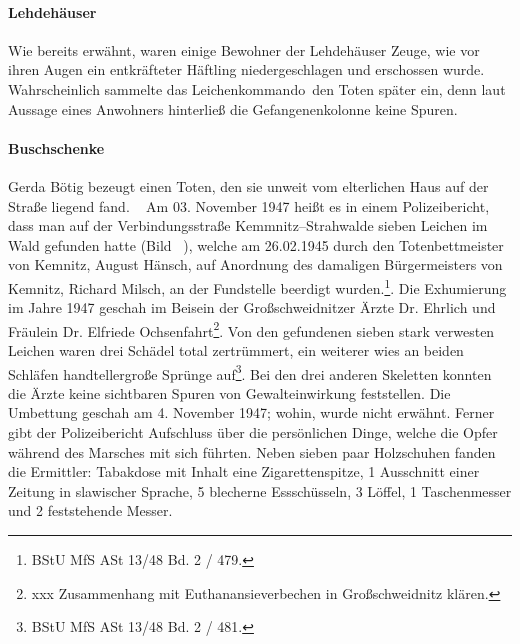 \paragraph{Lehdehäuser}
Wie bereits erwähnt, waren einige Bewohner der Lehdehäuser Zeuge, wie vor ihren Augen ein entkräfteter Häftling niedergeschlagen und erschossen wurde. Wahrscheinlich sammelte das \glqq Leichenkommando\grqq~den Toten später ein, denn laut Aussage eines Anwohners hinterließ die Gefangenenkolonne keine Spuren. 

\paragraph{Buschschenke\label{buschschenke}}
Gerda Bötig bezeugt einen Toten, den sie unweit vom elterlichen Haus auf der Straße liegend fand.
~\newline
Am 03. November 1947 heißt es in einem Polizeibericht, dass man auf der Verbindungsstraße Kemmnitz--Strahwalde sieben Leichen im Wald gefunden hatte (Bild ~), \glqq welche am 26.02.1945 durch den Totenbettmeister von Kemnitz, August Hänsch, auf Anordnung des damaligen Bürgermeisters von Kemnitz, Richard Milsch, an der Fundstelle beerdigt wurden.\grqq\footnote{BStU MfS ASt 13/48 Bd. 2 / 479.}. Die Exhumierung im Jahre 1947 geschah im Beisein der Großschweidnitzer Ärzte Dr. Ehrlich und Fräulein Dr. Elfriede Ochsenfahrt\footnote{xxx Zusammenhang mit Euthanansieverbechen in Großschweidnitz klären.}. Von den gefundenen sieben stark verwesten Leichen waren drei Schädel total zertrümmert, ein weiterer wies an beiden Schläfen handtellergroße Sprünge auf\footnote{BStU MfS ASt 13/48 Bd. 2 / 481.}. Bei den drei anderen Skeletten konnten die Ärzte keine sichtbaren Spuren von Gewalteinwirkung feststellen. Die Umbettung geschah am 4. November 1947; wohin, wurde nicht erwähnt.
\newline
Ferner gibt der Polizeibericht Aufschluss über die persönlichen Dinge, welche die Opfer während des Marsches mit sich führten. Neben sieben paar Holzschuhen fanden die Ermittler:  Tabakdose mit Inhalt eine Zigarettenspitze, 1 Ausschnitt einer Zeitung in slawischer Sprache, 5 blecherne Essschüsseln, 3 Löffel, 1 Taschenmesser und 2 feststehende Messer\grqq.


